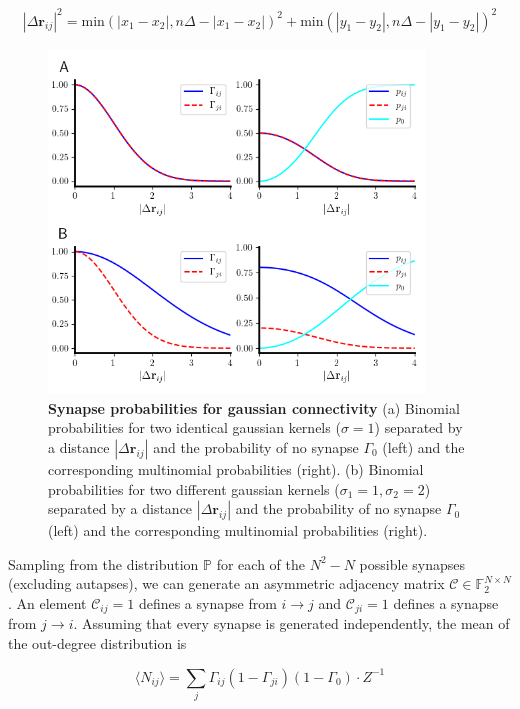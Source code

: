 \documentclass{ucetd}
\begin{document}
\begin{align*}
|\Delta\mathbf{r}_{ij}|^{2} = \mathrm{min}(|x_1 - x_2|, n\Delta - |x_1 - x_2|)^2 + \mathrm{min}(|y_1 - y_2|, n\Delta - |y_1 - y_2|)^2
\end{align*}

\begin{figure}[t!]
\centering
\includegraphics[width=100mm]{figure-7}
\caption{\textbf{Synapse probabilities for gaussian connectivity} (a) Binomial probabilities for two identical gaussian kernels ($\sigma=1$) separated by a distance $|\Delta\mathbf{r}_{ij}|$ and the probability of no synapse $\Gamma_{0}$ (left) and the corresponding multinomial probabilities (right). (b) Binomial probabilities for two different gaussian kernels ($\sigma_{1}=1, \sigma_{2}=2$) separated by a distance $|\Delta\mathbf{r}_{ij}|$ and the probability of no synapse $\Gamma_{0}$ (left) and the corresponding multinomial probabilities (right). }
\end{figure}

Sampling from the distribution $\mathbb{P}$ for each of the $N^{2} - N$ possible synapses (excluding autapses), we can generate an asymmetric adjacency matrix $\mathcal{C} \in \mathbb{F}_{2}^{N\times N}$. An element $\mathcal{C}_{ij} = 1$ defines a synapse from $i\rightarrow j$ and $\mathcal{C}_{ji} = 1$ defines a synapse from $j\rightarrow i$. Assuming that every synapse is generated independently, the mean of the out-degree distribution is

\begin{equation}
\langle N_{ij} \rangle = \sum_{j} \Gamma_{ij}(1-\Gamma_{ji})(1-\Gamma_{0})\cdot Z^{-1}
\end{equation}
\end{document}
